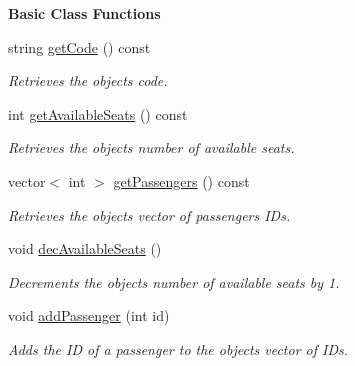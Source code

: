 \begin{Indent}\textbf{ Basic Class Functions}\par
\begin{DoxyCompactItemize}
\item 
string \hyperlink{group___date_ga4c0a7bb72ca7a054a394d13fc8cd9bde}{get\+Code} () const
\begin{DoxyCompactList}\small\item\em Retrieves the object\textquotesingle{}s code. \end{DoxyCompactList}\item 
int \hyperlink{group___date_ga41d42147d1210ce72f15e31a8414e0ad}{get\+Available\+Seats} () const
\begin{DoxyCompactList}\small\item\em Retrieves the object\textquotesingle{}s number of available seats. \end{DoxyCompactList}\item 
vector$<$ int $>$ \hyperlink{group___date_gabd197ec53b1215bed050d879d463e987}{get\+Passengers} () const
\begin{DoxyCompactList}\small\item\em Retrieves the object\textquotesingle{}s vector of passengers I\+Ds. \end{DoxyCompactList}\item 
void \hyperlink{group___date_ga491669933a1b091fa543591e9fd992aa}{dec\+Available\+Seats} ()
\begin{DoxyCompactList}\small\item\em Decrements the object\textquotesingle{}s number of available seats by 1. \end{DoxyCompactList}\item 
void \hyperlink{group___date_gac636e3c0c1e2794575bd3db14b5ee363}{add\+Passenger} (int id)
\begin{DoxyCompactList}\small\item\em Adds the ID of a passenger to the object\textquotesingle{}s vector of I\+Ds. \end{DoxyCompactList}\end{DoxyCompactItemize}
\end{Indent}

